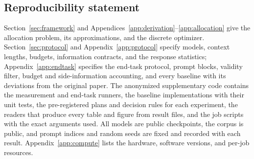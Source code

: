 \documentclass{article}
\theoremstyle{definition}
\begin{document}
\subsection*{Reproducibility statement}

Section~\ref{sec:framework} and Appendices~\ref{app:derivation}--\ref{app:allocation} give the allocation problem, its approximations, and the discrete optimizer.  Section~\ref{sec:protocol} and Appendix~\ref{app:protocol} specify models, context lengths, budgets, information contracts, and the response statistics; Appendix~\ref{app:endtask} specifies the end-task protocol, prompt blocks, validity filter, budget and side-information accounting, and every baseline with its deviations from the original paper.  The anonymized supplementary code contains the measurement and end-task runners, the baseline implementations with their unit tests, the pre-registered plans and decision rules for each experiment, the readers that produce every table and figure from result files, and the job scripts with the exact arguments used.  All models are public checkpoints, the corpus is public, and prompt indices and random seeds are fixed and recorded with each result.  Appendix~\ref{app:compute} lists the hardware, software versions, and per-job resources.




\clearpage
\appendix

\end{document}
